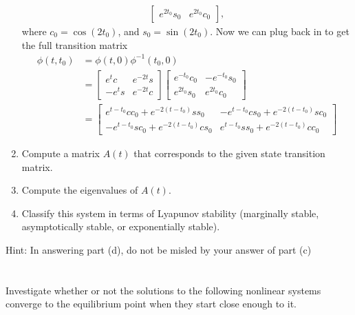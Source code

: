 \documentclass[10pt]{article}
\begin{document}
\begin{enumerate}[label=(\alph*)]
\begin{align*}
\begin{bmatrix}
    e^{2t_0}s_0 & e^{2t_0}c_0
  \end{bmatrix},
\end{align*}
where $c_0 = \cos(2t_0)$, and $s_0 = \sin(2t_0)$. Now we can plug back
in to get the full transition matrix
\begin{equation*}
  \begin{split}
    \phi(t,t_0) &= \phi(t,0)\phi^{-1}(t_0, 0)\\
    &=
    \begin{bmatrix}
      e^tc & e^{-2t} s \\ -e^ts & e^{-2t}c
    \end{bmatrix}
    \begin{bmatrix}
      e^{-t_0}c_0 & -e^{-t_0}s_0 \\
      e^{2t_0}s_0 & e^{2t_0}c_0
    \end{bmatrix}\\
    &= 
    \begin{bmatrix}
      e^{t-t_0}cc_0 + e^{-2(t-t_0)}ss_0 & -e^{t-t_0}cs_0 + e
      ^{-2(t-t_0)}s c_0\\
      -e^{t-t_0}sc_0 +e^{-2(t-t_0)}cs_0 & e^{t-t_0}ss_0 +
      e^{-2(t-t_0)}cc_0 
    \end{bmatrix}
  \end{split}
\end{equation*}
\item Compute a matrix $A(t)$ that corresponds to the given state
  transition matrix.
\item Compute the eigenvalues of $A(t)$.
\item Classify this system in terms of Lyapunov stability (marginally
  stable, asymptotically stable, or exponentially stable).
\end{enumerate}

Hint: In answering part (d), do not be misled by your answer of part
(c)


\section{}
Investigate whether or not the solutions to the following nonlinear
systems converge to the equilibrium point when they start close enough
to it.
\end{document}
